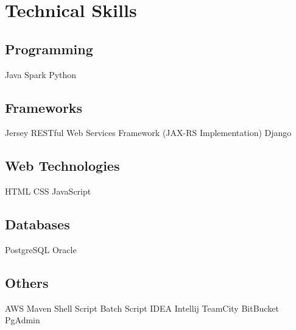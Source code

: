 \documentclass[]{deedy-resume-openfont}
\begin{document}
\begin{minipage}[t]{0.33\textwidth}
\section{Technical Skills}
\subsection{Programming}
Java \textbullet{} Spark \textbullet{} Python\\
\sectionsep
\subsection{Frameworks}
Jersey RESTful Web Services Framework (JAX-RS Implementation)\textbullet{} Django
\sectionsep
\subsection{Web Technologies}
HTML \textbullet{} CSS \textbullet{} JavaScript
\sectionsep
\subsection{Databases}
PostgreSQL \textbullet{} Oracle \textbullet{}
\sectionsep
\subsection{Others}
AWS \textbullet{} Maven \textbullet{} Shell Script \textbullet{} Batch Script \textbullet{} IDEA Intellij \textbullet{} TeamCity\textbullet{} BitBucket \textbullet{} PgAdmin

%
%

\end{minipage} 
\hfill
\end{document}
